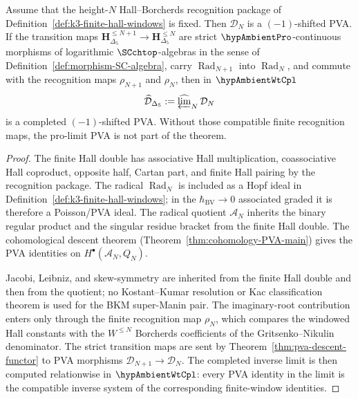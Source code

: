 \begin{proposition}
\label{rem:pvadr-MC-integrability}
\label{prop:pvadr-windowwise-descent}
Assume that the height-$N$ Hall--Borcherds recognition package of
Definition~\ref{def:k3-finite-hall-windows} is fixed.  Then
$\mathcal D_N$ is a $(-1)$-shifted PVA.  If the transition maps
$\mathbf H_{\Delta_5}^{\le N+1}\to\mathbf H_{\Delta_5}^{\le N}$
are strict $\hypAmbientPro$-continuous morphisms of logarithmic
$\SCchtop$-algebras in the sense of
Definition~\ref{def:morphism-SC-algebra}, carry
$\operatorname{Rad}_{N+1}$ into $\operatorname{Rad}_N$, and commute
with the recognition maps $\rho_{N+1}$ and $\rho_N$, then in
$\hypAmbientWtCpl$
\[
 \widehat{\mathcal D}_{\Delta_5}
 :=
 \widehat{\varprojlim}_{N}\,\mathcal D_N
\]
is a completed $(-1)$-shifted PVA.  Without those compatible finite
recognition maps, the pro-limit PVA is not part of the theorem.
\end{proposition}

\begin{proof}
The finite Hall double has associative Hall multiplication,
coassociative Hall coproduct, opposite half, Cartan part, and finite
Hall pairing by the recognition package.  The radical
$\operatorname{Rad}_N$ is included as a Hopf ideal in
Definition~\ref{def:k3-finite-hall-windows}; in the
$\hbar_{\mathrm{BV}}\to0$ associated graded it is therefore a
Poisson/PVA ideal.  The radical quotient $\mathcal A_N$ inherits the
binary regular product and the singular residue bracket from the finite
Hall double.  The cohomological descent theorem
(Theorem~\ref{thm:cohomology-PVA-main}) gives the PVA identities on
$H^\bullet(\mathcal A_N,Q_N)$.

Jacobi, Leibniz, and skew-symmetry are inherited from the finite Hall
double and then from the quotient; no Kostant--Kumar resolution or
Kac classification theorem is used for the BKM super-Manin pair.  The
imaginary-root contribution enters only through the finite recognition
map $\rho_N$, which compares the windowed Hall constants with the
$W^{\le N}$ Borcherds coefficients of the Gritsenko--Nikulin
denominator.  The strict transition maps are sent by
Theorem~\ref{thm:pva-descent-functor} to PVA morphisms
$\mathcal D_{N+1}\to\mathcal D_N$.  The completed inverse limit is
then computed relationwise in $\hypAmbientWtCpl$: every PVA identity
in the limit is the compatible inverse system of the corresponding
finite-window identities.
\end{proof}

